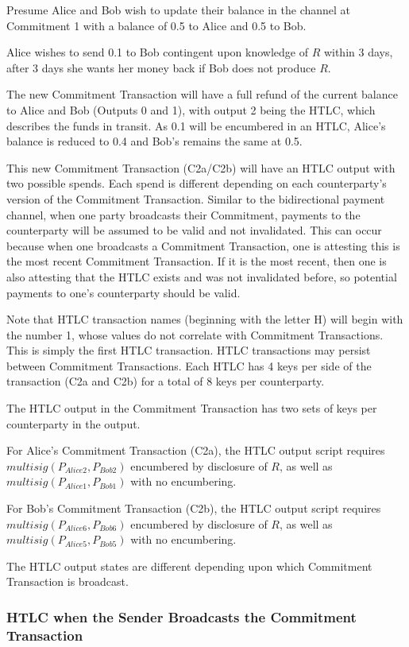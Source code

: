 \documentclass[letterpaper,11pt]{article}
\begin{document}
Presume Alice and Bob wish to update their balance in the channel at Commitment
1 with a balance of 0.5 to Alice and 0.5 to Bob.

Alice wishes to send 0.1 to Bob contingent upon knowledge of $R$ within 3 days,
after 3 days she wants her money back if Bob does not produce $R$.

The new Commitment Transaction will have a full refund of the current balance to
Alice and Bob (Outputs 0 and 1), with output 2 being the HTLC, which describes
the funds in transit. As 0.1 will be encumbered in an HTLC, Alice's balance is
reduced to 0.4 and Bob's remains the same at 0.5.

This new Commitment Transaction (C2a/C2b) will have an HTLC output with two
possible spends. Each spend is different depending on each counterparty's
version of the Commitment Transaction. Similar to the bidirectional payment
channel, when one party broadcasts their Commitment, payments to the
counterparty will be assumed to be valid and not invalidated. This can occur
because when one broadcasts a Commitment Transaction, one is attesting this is
the most recent Commitment Transaction. If it is the most recent, then one
is also attesting that the HTLC exists and was not invalidated before, so
potential payments to one's counterparty should be valid.

Note that HTLC transaction names (beginning with the letter H) will begin with
the number 1, whose values do not correlate with Commitment Transactions. This
is simply the first HTLC transaction. HTLC transactions may persist between
Commitment Transactions. Each HTLC has 4 keys per side of the
transaction (C2a and C2b) for a total of 8 keys per counterparty.

The HTLC output in the Commitment Transaction has two sets of keys per
counterparty in the output. 

For Alice's Commitment Transaction (C2a), the HTLC output script requires
$multisig(P_{Alice2}, P_{Bob2})$ encumbered by disclosure of $R$, as well as
$multisig(P_{Alice1}, P_{Bob1})$ with no encumbering.

For Bob's Commitment Transaction (C2b), the HTLC output script requires
$multisig(P_{Alice6}, P_{Bob6})$ encumbered by disclosure of $R$, as well as
$multisig(P_{Alice5}, P_{Bob5})$ with no encumbering.

The HTLC output states are different depending upon which Commitment Transaction
is broadcast.

\subsubsection{HTLC when the Sender Broadcasts the Commitment Transaction}
\end{document}

